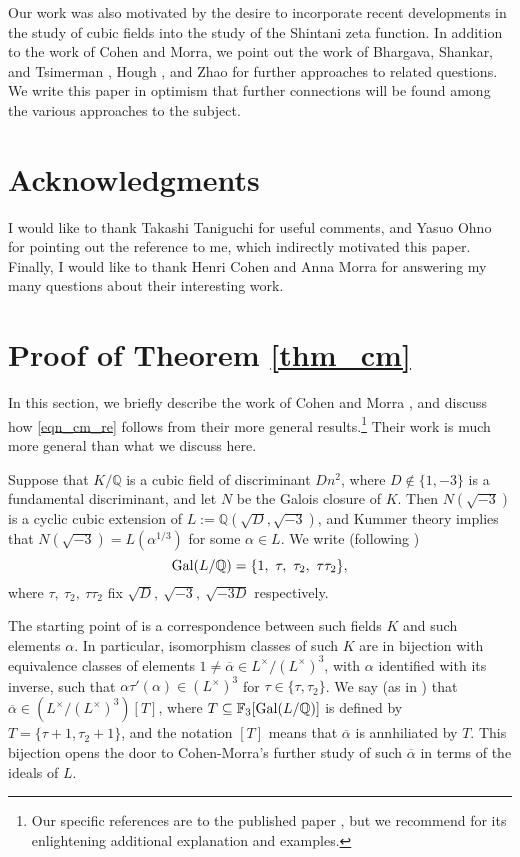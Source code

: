 \documentclass[12pt]{amsart}
\theoremstyle{remark}
\numberwithin{theorem}{section} \numberwithin{equation}{section}
\newcommand{\F}{\mathbb{F}}
\newcommand{\Q}{\mathbb{Q}}
\newcommand{\Gal}{{\text {\rm Gal}}}
\begin{document}
Our work was also motivated by the desire to incorporate recent developments in the study of cubic fields into the study
of the Shintani zeta function. In addition to the work of Cohen and Morra, we point out the work of 
Bhargava, Shankar, and Tsimerman \cite{BST}, Hough \cite{H}, and Zhao \cite{Z} for further approaches to related questions.
We write this paper in optimism that further connections will be found among the various approaches to the subject.

\section{Acknowledgments}
I would like to thank Takashi Taniguchi for useful comments, and 
Yasuo Ohno
for pointing out the reference \cite{IS} to me, which indirectly motivated this paper.
Finally, I would like to thank Henri Cohen and Anna Morra for answering my many questions about their interesting work.

\section{Proof of Theorem \ref{thm_cm}}\label{sec_cm}
In this section, we briefly describe the work of Cohen and Morra \cite{CM, M}, and discuss how 
\eqref{eqn_cm_re} follows from their more general results.\footnote{Our specific references are to the published paper 
\cite{CM}, but we recommend \cite{M} for its enlightening additional explanation and examples.} 
Their work is much more general than what we discuss here.

Suppose that $K/\Q$ is a cubic field of discriminant $D n^2$, where $D \not \in \{ 1, -3 \}$ is a fundamental discriminant, and 
let $N$ be the Galois closure of $K$. Then $N(\sqrt{-3})$ is a cyclic cubic extension of $L := \Q(\sqrt{D}, \sqrt{-3})$,
and Kummer theory implies that $N(\sqrt{-3}) = L(\alpha^{1/3})$ for some $\alpha \in L$. We write (following \cite[Remark 2.2]{CM})
\begin{equation}
\Gal(L/\Q) = \{1, \ \tau, \ \tau_2, \ \tau \tau_2 \},
\end{equation}
where $\tau, \ \tau_2, \ \tau \tau_2$ fix $\sqrt{D}, \ \sqrt{-3}, \ \sqrt{-3D}$ respectively.

The starting point of \cite{CM}
is a correspondence between such fields $K$ and such elements $\alpha$.
In particular, isomorphism classes of such $K$ are in bijection with equivalence classes of elements $1 \neq \overline{\alpha} \in L^{\times}/(L^{\times})^3$,
with $\alpha$ identified with its inverse,
such that $\alpha \tau'(\alpha) \in (L^{\times})^3$ for $\tau \in \{ \tau, \tau_2 \}$. 
We say (as in \cite[Definition 2.3]{CM}) that $\overline{\alpha} \in (L^{\times}/(L^{\times})^3)[T]$, where
$T \subseteq \F_3[\Gal(L/\Q)]$ is defined by $T = \{ \tau + 1, \tau_2 + 1 \}$, and the notation $[T]$ means
that $\overline{\alpha}$ is annhiliated by $T$. This bijection opens the door to Cohen-Morra's
further study of such $\overline{\alpha}$ in terms of the ideals of $L$.
\end{document}
